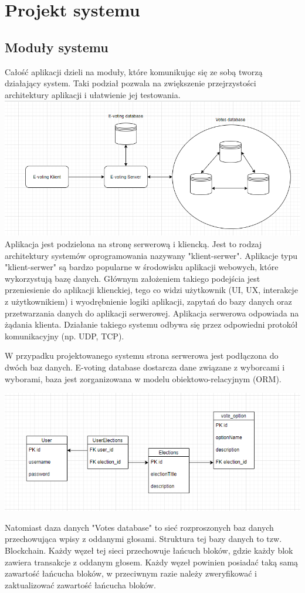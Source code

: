 \documentclass{report}
\begin{document}
\chapter{Projekt systemu}
\section{Moduły systemu}
Całość aplikacji dzieli na moduły, które komunikując się ze sobą tworzą działający system. Taki podział pozwala na zwiększenie przejrzystości architektury aplikacji i ułatwienie jej testowania.
\includegraphics[width=\textwidth]{images/podział_na_moduły.png}
Aplikacja jest podzielona na stronę serwerową i kliencką. Jest to rodzaj architektury systemów oprogramowania nazywany "klient-serwer". Aplikacje typu "klient-serwer" są bardzo popularne w środowisku aplikacji webowych, które wykorzystują bazę danych. Głównym założeniem takiego podejścia jest przeniesienie do aplikacji klienckiej, tego co widzi użytkownik (UI, UX, interakcje z użytkownikiem) i wyodrębnienie logiki aplikacji, zapytań do bazy danych oraz przetwarzania danych do aplikacji serwerowej. Aplikacja serwerowa odpowiada na żądania klienta. Działanie takiego systemu odbywa się przez odpowiedni protokół komunikacyjny (np. UDP, TCP).



W przypadku projektowanego systemu strona serwerowa jest podłączona do dwóch baz danych. E-voting database dostarcza dane związane z wyborcami i wyborami, baza jest zorganizowana w modelu obiektowo-relacyjnym (ORM).

\includegraphics[width=\textwidth]{images/Baza_danych.png}

Natomiast daza danych "Votes database" to sieć rozproszonych baz danych przechowująca wpisy z oddanymi głosami. Struktura tej bazy danych to tzw. Blockchain. Każdy węzeł tej sieci przechowuje łańcuch bloków, gdzie każdy blok zawiera transakcje z oddanym głosem. Każdy węzeł powinien posiadać taką samą zawartość łańcucha bloków, w przeciwnym razie należy zweryfikować i zaktualizować zawartość łańcucha bloków.
\end{document}

